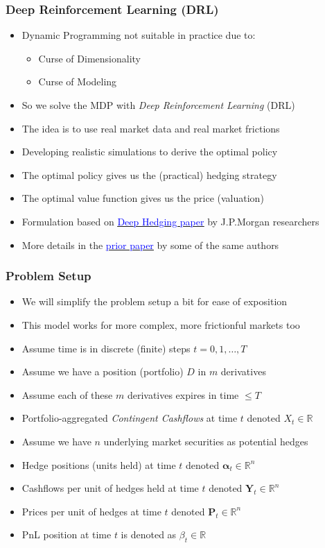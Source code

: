 \documentclass[handout]{beamer}
\begin{document}
\begin{frame}
\frametitle{Deep Reinforcement Learning (DRL)}
\pause
\begin{itemize}[<+->]
\item Dynamic Programming not suitable in practice due to:
\begin{itemize}
\item Curse of Dimensionality
\item Curse of Modeling
\end{itemize}
\item So we solve the MDP with {\em Deep Reinforcement Learning} (DRL)
\item The idea is to use real market data and real market frictions
\item Developing realistic simulations to derive the optimal policy
\item The optimal policy gives us the (practical) hedging strategy
\item The optimal value function gives us the price (valuation)
\item Formulation based on \href{https://papers.ssrn.com/sol3/papers.cfm?abstract_id=3355706}{\underline{\textcolor{blue}{Deep Hedging paper}}} by J.P.Morgan researchers
\item More details in the \href{https://papers.ssrn.com/sol3/papers.cfm?abstract_id=3355706}{\underline{\textcolor{blue}{prior paper}}} by some of the same authors
\end{itemize}
\end{frame}

\begin{frame}
\frametitle{Problem Setup}
\pause
\begin{itemize}[<+->]
\item We will simplify the problem setup a bit for ease of exposition
\item This model works for more complex, more frictionful markets too
\item Assume time is in discrete (finite) steps $t = 0, 1, \ldots, T$
\item Assume we have a position (portfolio) $D$ in $m$ derivatives
\item Assume each of these $m$ derivatives expires in time $ \leq T$
\item Portfolio-aggregated {\em Contingent Cashflows} at time $t$ denoted $X_t \in \mathbb{R}$
\item Assume we have $n$ underlying market securities as potential hedges
\item Hedge positions (units held) at time $t$ denoted $\bm{\alpha}_t \in \mathbb{R}^n$
\item Cashflows per unit of hedges held at time $t$ denoted $\bm{Y}_t \in \mathbb{R}^n$
\item Prices per unit of hedges at time $t$ denoted $\bm{P}_t \in \mathbb{R}^n$
\item PnL position at time $t$ is denoted as $\beta_t \in \mathbb{R}$
\end{itemize}
\end{frame}
\end{document}
